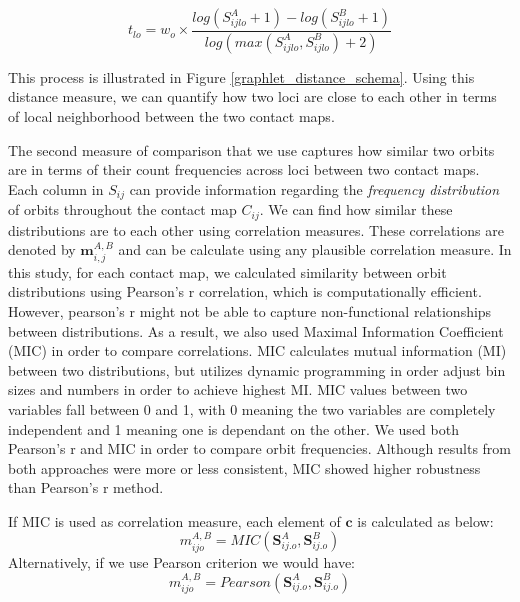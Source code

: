 \documentclass[]{article}
\begin{document}
\begin{equation}
    t_{lo} = w_o \times 
    \frac{log(S_{ijlo}^A+1) - log(S_{ijlo}^B+1)}
    {log(max(S_{ijlo}^A, S_{ijlo}^B) + 2)}
    \label{eq:distance_single}
\end{equation}


This process is illustrated in Figure \ref{graphlet_distance_schema}.
Using this distance measure, we can quantify how two loci are close to
each other in terms of local neighborhood between the two contact maps.

The second measure of comparison that we use captures how 
similar two orbits are in terms of their count 
frequencies across loci between two contact maps. 
Each column in $S_{ij}$ can provide information
regarding the \textit{frequency distribution} of orbits throughout
the contact map $C_{ij}$. 
We can find how similar these distributions are to each other using
correlation measures.
These correlations are denoted by $\mathbf{m}^{\scriptscriptstyle A,B}_{i,j}$ and
can be calculate using
any plausible correlation measure. 
In this study, for each contact map,  we calculated
similarity between orbit distributions using Pearson's r 
correlation, which is computationally efficient.
However, pearson's r might not be able to capture
non-functional relationships between distributions. As a result, we
also used Maximal Information Coefficient (MIC) 
\cite{reshef2011detecting} in order to compare
correlations. MIC calculates mutual information (MI) between two
distributions, but utilizes dynamic programming in order adjust
bin sizes and numbers in order to achieve highest MI.
MIC values between two variables fall between 0 and 1,
with 0 meaning the two variables are completely independent
and 1 meaning one is dependant on the other.
We used both Pearson's r and MIC in order to compare orbit
frequencies. Although results from both approaches were more
or less consistent, MIC showed higher robustness than Pearson's 
r method.

If MIC is used as correlation measure, each element of 
 $\mathbf{c}$ is calculated as below:
\begin{equation}
    m^{\scriptscriptstyle A,B}_{ijo} = MIC(\mathbf{S}^A_{ij.o}, \mathbf{S}^B_{ij.o})
    \label{eq:mic}
\end{equation}
Alternatively, if we use Pearson criterion we would have:
\begin{equation}
    m^{\scriptscriptstyle A,B}_{ijo} = Pearson(\mathbf{S}^A_{ij.o}, \mathbf{S}^B_{ij.o})
    \label{eq:pearson}
\end{equation}
\end{document}

